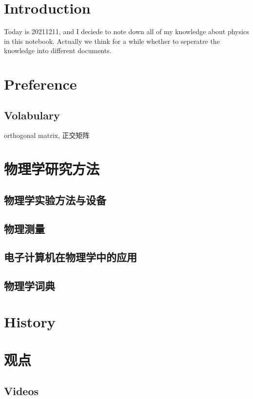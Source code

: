 \chapter{Introduction}
Today is 20211211, and I deciede to note down all of my knowledge about physics in this notebook. Actually we think for a while whether to seperatre the knowledge into different documents.

\chapter{Preference}



\section{Volabulary}
orthogonal matrix, 正交矩阵



\chapter{物理学研究方法}
    \section{物理学实验方法与设备}
    \section{物理测量}
    \section{电子计算机在物理学中的应用}
    \section{物理学词典}




\chapter{History}





\chapter{观点}

\section{Videos}

